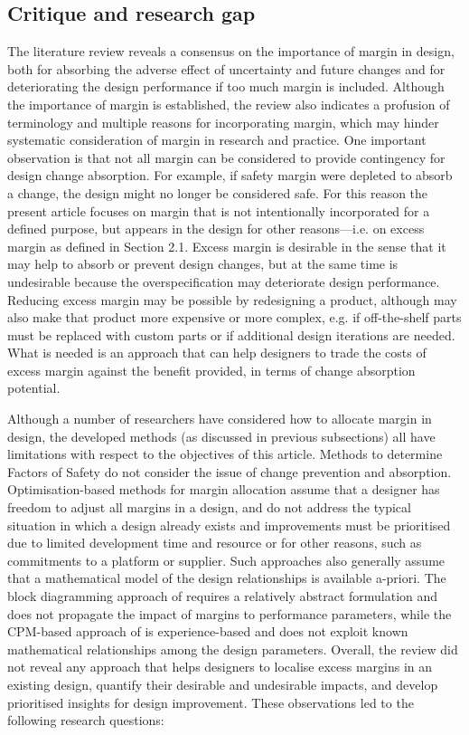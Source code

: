    \subsection{Critique and research gap}\label{researchquestions}
The literature review reveals a consensus on the importance of margin in design, both for absorbing the adverse effect of uncertainty and future changes and for deteriorating the design performance if too much margin is included. Although the importance of margin is established, the review also indicates a profusion of terminology and multiple reasons for incorporating margin, which may hinder systematic consideration of margin in research and practice. One important observation is that not all margin can be considered to provide contingency for design change absorption. For example, if safety margin were depleted to absorb a change, the design might no longer be considered safe. For this reason the present article focuses on margin that is not intentionally incorporated for a defined purpose, but appears in the design for other reasons---i.e. on excess margin as defined in Section 2.1. Excess margin is desirable in the sense that it may help to absorb or prevent design changes, but at the same time is undesirable because the overspecification may deteriorate design performance. Reducing excess margin may be possible by redesigning a product, although may also make that product more expensive or more complex, e.g. if off-the-shelf parts must be replaced with custom parts or if additional design iterations are needed. What is needed is an approach that can help designers to trade the costs of excess margin against the benefit provided, in terms of change absorption potential.

Although  a number of researchers have considered how to allocate margin in design, the developed methods (as discussed in previous subsections) all have limitations with respect to the objectives of this article. Methods to determine Factors of Safety do not consider the issue of change prevention and absorption. Optimisation-based methods for margin allocation assume that a designer has freedom to adjust all margins in a design, and do not address the typical situation in which a design already exists and improvements must be prioritised due to limited development time and resource or for other reasons, such as commitments to a platform or supplier. Such approaches also generally assume that a mathematical model of the design relationships is available a-priori. The block diagramming approach of \cite{Cansler2016} requires a relatively abstract formulation and does not propagate the impact of margins to performance parameters, while the CPM-based approach of \cite{lebjioui2018} is experience-based and does not exploit known mathematical relationships among the design parameters. Overall, the review did not reveal any approach that helps designers to localise excess margins in an existing design, quantify their desirable and undesirable impacts, and develop prioritised insights for design improvement.  These observations led to the following research questions:
  
